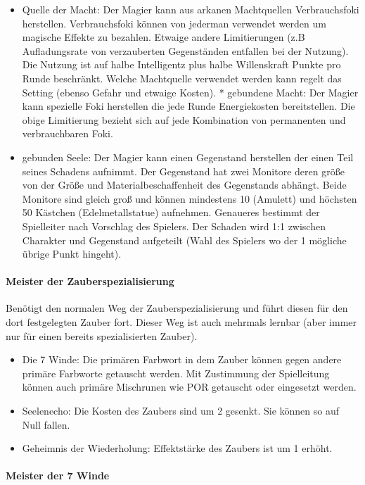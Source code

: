 \documentclass{article}
\begin{document}
\begin{itemize}
\item Quelle der Macht: Der Magier kann aus arkanen Machtquellen Verbrauchsfoki herstellen. Verbrauchsfoki können von jederman verwendet werden um magische Effekte zu bezahlen. Etwaige andere Limitierungen (z.B Aufladungsrate von verzauberten Gegenständen entfallen bei der Nutzung). Die Nutzung ist auf halbe Intelligentz plus halbe Willenskraft Punkte pro Runde beschränkt. Welche Machtquelle verwendet werden kann regelt das Setting (ebenso Gefahr und etwaige Kosten).  * gebundene Macht: Der Magier kann spezielle Foki herstellen die jede Runde Energiekosten bereitstellen. Die obige Limitierung bezieht sich auf jede Kombination von permanenten und verbrauchbaren Foki.
\item gebunden Seele: Der Magier kann einen Gegenstand herstellen der einen Teil seines Schadens aufnimmt. Der Gegenstand hat zwei Monitore deren größe von der Größe und Materialbeschaffenheit des Gegenstands abhängt. Beide Monitore sind gleich groß und können mindestens 10 (Amulett) und höchsten 50 Kästchen (Edelmetallstatue) aufnehmen. Genaueres bestimmt der Spielleiter nach Vorschlag des Spielers. Der Schaden wird 1:1 zwischen Charakter und Gegenstand aufgeteilt (Wahl des Spielers wo der 1 mögliche übrige Punkt hingeht).
\end{itemize}

\paragraph{Meister der Zauberspezialisierung}

Benötigt den normalen Weg der Zauberspezialisierung und führt diesen für den dort festgelegten Zauber fort. Dieser
Weg ist auch mehrmals lernbar (aber immer nur für einen bereits spezialisierten Zauber).

\begin{itemize}
\item Die 7 Winde: Die primären Farbwort in dem Zauber können gegen andere primäre Farbworte getauscht werden. Mit Zustimmung der Spielleitung können auch primäre Mischrunen wie POR getauscht oder eingesetzt werden.
\item Seelenecho: Die Kosten des Zaubers sind um 2 gesenkt. Sie können so auf Null fallen.
\item Geheimnis der Wiederholung: Effektstärke des Zaubers ist um 1 erhöht.
\end{itemize}

\paragraph{Meister der 7 Winde}
\end{document}

